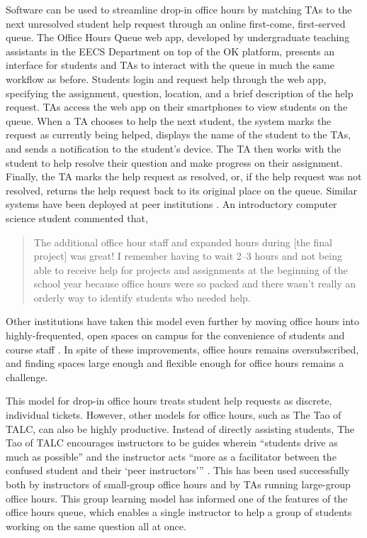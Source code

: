 Software can be used to streamline drop-in office hours by matching TAs to the next unresolved student help request through an online first-come, first-served queue. The Office Hours Queue web app, developed by undergraduate teaching assistants in the EECS Department on top of the OK platform, presents an interface for students and TAs to interact with the queue in much the same workflow as before. Students login and request help through the web app, specifying the assignment, question, location, and a brief description of the help request. TAs access the web app on their smartphones to view students on the queue. When a TA chooses to help the next student, the system marks the request as currently being helped, displays the name of the student to the TAs, and sends a notification to the student's device. The TA then works with the student to help resolve their question and make progress on their assignment. Finally, the TA marks the help request as resolved, or, if the help request was not resolved, returns the help request back to its original place on the queue. Similar systems have been deployed at peer institutions \cite{Smith:2017, MacWilliam:2013}. An introductory computer science student commented that,
\begin{quote}
    The additional office hour staff and expanded hours during [the final project] was great! I remember having to wait 2--3 hours and not being able to receive help for projects and assignments at the beginning of the school year because office hours were so packed and there wasn't really an orderly way to identify students who needed help.
\end{quote}
Other institutions have taken this model even further by moving office hours into highly-frequented, open spaces on campus for the convenience of students and course staff \cite{MacWilliam:2013}. In spite of these improvements, office hours remains oversubscribed, and finding spaces large enough and flexible enough for office hours remains a challenge.

This model for drop-in office hours treats student help requests as discrete, individual tickets. However, other models for office hours, such as The Tao of TALC, can also be highly productive. Instead of directly assisting students, The Tao of TALC encourages instructors to be guides wherein ``students drive as much as possible'' and the instructor acts ``more as a facilitator between the confused student and their `peer instructors'{}'' \cite{Astrachan:2007}. This has been used successfully both by instructors of small-group office hours and by TAs running large-group office hours. This group learning model has informed one of the features of the office hours queue, which enables a single instructor to help a group of students working on the same question all at once.

